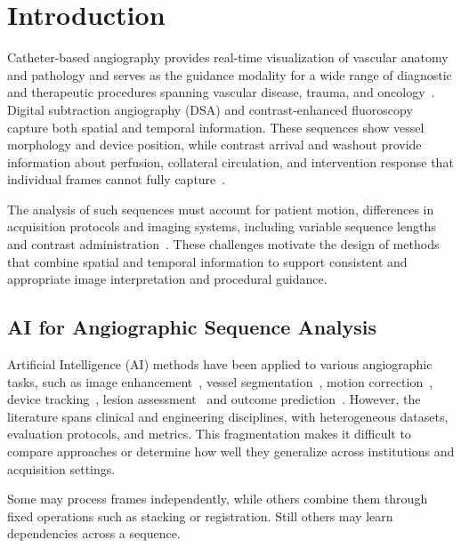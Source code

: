 \section{Introduction}
\label{sec:introduction}

Catheter-based angiography provides real-time visualization of vascular anatomy and pathology and serves as the guidance modality for a wide range of diagnostic and therapeutic procedures spanning vascular disease, trauma, and oncology~\cite{valji2011practice,kaufman2013vascular}. Digital subtraction angiography (DSA) and contrast-enhanced fluoroscopy capture both spatial and temporal information. These sequences show vessel morphology and device position, while contrast arrival and washout provide information about perfusion, collateral circulation, and intervention response that individual frames cannot fully capture~\cite{ACRReporting2024}.

The analysis of such sequences must account for patient motion, differences in acquisition protocols and imaging systems, including variable sequence lengths and contrast administration~\cite{shi2021temporal}. These challenges motivate the design of methods that combine spatial and temporal information to support consistent and appropriate image interpretation and procedural guidance.

\subsection{AI for Angiographic Sequence Analysis}
Artificial Intelligence (AI) methods have been applied to various angiographic tasks, such as image enhancement~\cite{ref152}, vessel segmentation~\cite{ref64}, motion correction~\cite{R2400}, device tracking~\cite{ref99}, lesion assessment~\cite{ref100} and outcome prediction~\cite{ref127}. However, the literature spans clinical and engineering disciplines, with heterogeneous datasets, evaluation protocols, and metrics. This fragmentation makes it difficult to compare approaches or determine how well they generalize across institutions and acquisition settings.

 Some may process frames independently, while others combine them through fixed operations such as stacking or registration. Still others may learn dependencies across a sequence. 



